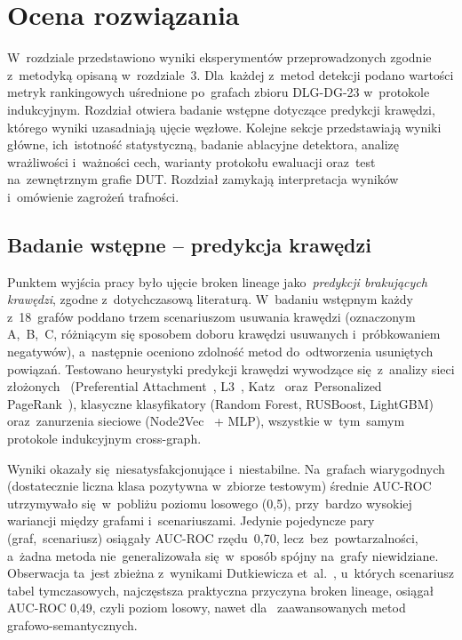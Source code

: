 \documentclass[polish,master,a4paper,oneside]{ppfcmthesis}
\renewcommand{\_}{\origtextunderscore\ifmmode\else\allowbreak\fi}
\begin{document}
\chapter{Ocena rozwiązania}

W~rozdziale przedstawiono wyniki eksperymentów przeprowadzonych zgodnie
z~metodyką opisaną w~rozdziale~3. Dla~każdej z~metod detekcji
podano wartości metryk rankingowych uśrednione po~grafach zbioru DLG-DG-23
w~protokole indukcyjnym. Rozdział otwiera badanie wstępne dotyczące predykcji
krawędzi, którego wyniki uzasadniają ujęcie węzłowe. Kolejne sekcje przedstawiają
wyniki główne, ich~istotność statystyczną, badanie ablacyjne detektora,
analizę wrażliwości i~ważności cech, warianty protokołu ewaluacji oraz~test
na~zewnętrznym grafie DUT. Rozdział zamykają interpretacja wyników
i~omówienie zagrożeń trafności.

\section{Badanie wstępne – predykcja krawędzi}
\label{sec:badanie_wstepne}

Punktem wyjścia pracy było ujęcie broken lineage jako~\emph{predykcji
brakujących krawędzi}, zgodne z~dotychczasową literaturą. W~badaniu wstępnym
każdy z~18~grafów poddano trzem scenariuszom usuwania krawędzi (oznaczonym
A,~B,~C, różniącym się sposobem doboru krawędzi usuwanych i~próbkowaniem
negatywów), a~następnie oceniono zdolność metod do~odtworzenia usuniętych
powiązań. Testowano heurystyki predykcji krawędzi wywodzące się~z~analizy sieci
złożonych~\cite{LibenNowell2007,Martinez2016} (Preferential
Attachment~\cite{Barabasi1999}, L3~\cite{Kovacs2019}, Katz~\cite{Katz1953}
oraz~Personalized PageRank~\cite{Page1999}), klasyczne klasyfikatory (Random Forest,
RUSBoost, LightGBM) oraz~zanurzenia sieciowe (Node2Vec~\cite{Grover2016}
+ MLP), wszystkie w~tym~samym protokole indukcyjnym cross-graph.

Wyniki okazały się~niesatysfakcjonujące i~niestabilne. Na~grafach wiarygodnych
(dostatecznie liczna klasa pozytywna w~zbiorze testowym) średnie AUC-ROC
utrzymywało się~w~pobliżu poziomu losowego (0{,}5), przy~bardzo wysokiej
wariancji między grafami i~scenariuszami. Jedynie pojedyncze pary
(graf,~scenariusz) osiągały AUC-ROC rzędu~0{,}70, lecz~bez~powtarzalności,
a~żadna metoda nie~generalizowała się~w~sposób spójny na~grafy niewidziane.
Obserwacja ta~jest zbieżna z~wynikami Dutkiewicza et~al.~\cite{Dutkiewicz2026},
u~których scenariusz tabel tymczasowych, najczęstsza praktyczna przyczyna
broken lineage, osiągał AUC-ROC 0{,}49, czyli poziom losowy, nawet dla~
zaawansowanych metod grafowo-semantycznych.
\end{document}

